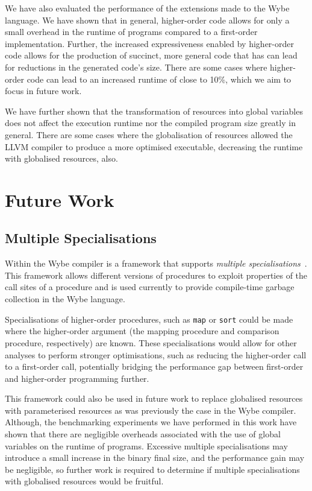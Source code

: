We have also evaluated the performance of the extensions made to the Wybe language. We have shown that in general, higher-order code allows for only a small overhead in the runtime of programs compared to a first-order implementation. Further, the increased expressiveness enabled by higher-order code allows for the production of succinct, more general code that has can lead for reductions in the generated code's size. There are some cases where higher-order code can lead to an increased runtime of close to 10\%, which we aim to focus in future work.

We have further shown that the transformation of resources into global variables does not affect the execution runtime nor the compiled program size greatly in general. There are some cases where the globalisation of resources allowed the LLVM compiler to produce a more optimised executable, decreasing the runtime with globalised resources, also.

\section{Future Work}
\label{sec:future-work}

\subsection{Multiple Specialisations}

Within the Wybe compiler is a framework that supports \textit{multiple specialisations}~\cite{chen2020multiple}. This framework allows different versions of procedures to exploit properties of the call sites of a procedure and is used currently to provide compile-time garbage collection in the Wybe language. 

Specialisations of higher-order procedures, such as \texttt{map} or \texttt{sort} could be made where the higher-order argument (the mapping procedure and comparison procedure, respectively) are known. These specialisations would allow for other analyses to perform stronger optimisations, such as reducing the higher-order call to a first-order call, potentially bridging the performance gap between first-order and higher-order programming further. 

This framework could also be used in future work to replace globalised resources with parameterised resources as was previously the case in the Wybe compiler. Although, the benchmarking experiments we have performed in this work have shown that there are negligible overheads associated with the use of global variables on the runtime of programs. Excessive multiple specialisations may introduce a small increase in the binary final size, and the performance gain may be negligible, so further work is required to determine if multiple specialisations with globalised resources would be fruitful.


